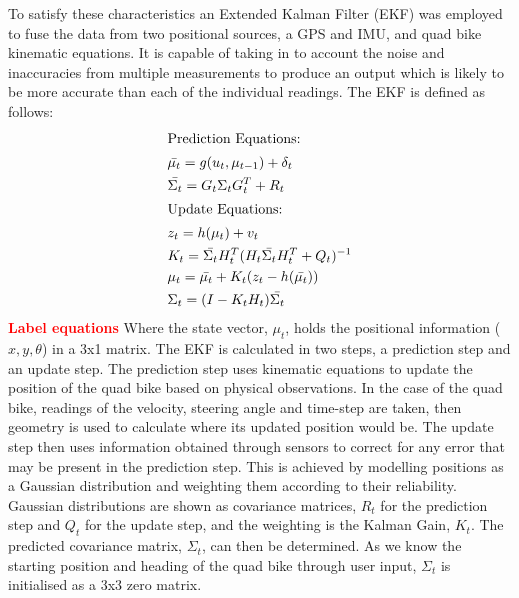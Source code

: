 \documentclass[main.tex]{subfiles}
\begin{document}
To satisfy these characteristics an Extended Kalman Filter (EKF) was employed to fuse the data from two positional sources, a GPS and IMU, and quad bike kinematic equations. It is capable of taking in to account the noise and inaccuracies from multiple measurements to produce an output which is likely to be more accurate than each of the individual readings. The EKF is defined as follows:
\begin{align*}
\shortintertext{Prediction Equations:}
&\bar{\mu_t} = g(u_t, \mu_{t-1}) + \delta_t\\
&\bar{\Sigma_t} = G_t\Sigma_tG_t^T + R_t\\
\shortintertext{Update Equations:}
&z_t = h(\mu_t) + v_t\\
&K_t = \bar{\Sigma_t}H_t^T(H_t\bar{\Sigma_t}H_t^T + Q_t)^{-1}\\
&\mu_t = \bar{\mu_t} + K_t(z_t-h(\bar{\mu_t}))\\
&\Sigma_t = (I - K_tH_t)\bar{\Sigma_t}
\end{align*}
\textcolor{red}{\textbf{Label equations}} Where the state vector, $\mu_t$, holds the positional information ($x, y, \theta$) in a 3x1 matrix. The EKF is calculated in two steps, a prediction step and an update step. The prediction step uses kinematic equations to update the position of the quad bike based on physical observations. In the case of the quad bike, readings of the velocity, steering angle and time-step are taken, then geometry is used to calculate where its updated position would be. The update step then uses information obtained through sensors to correct for any error that may be present in the prediction step. This is achieved by modelling positions as a Gaussian distribution and weighting them according to their reliability. Gaussian distributions are shown as covariance matrices, $R_t$ for the prediction step and $Q_t$ for the update step, and the weighting is the Kalman Gain, $K_t$. The predicted covariance matrix, $\Sigma_t$, can then be determined. As we know the starting position and heading of the quad bike through user input, $\Sigma_t$ is initialised as a 3x3 zero matrix.
\end{document}
